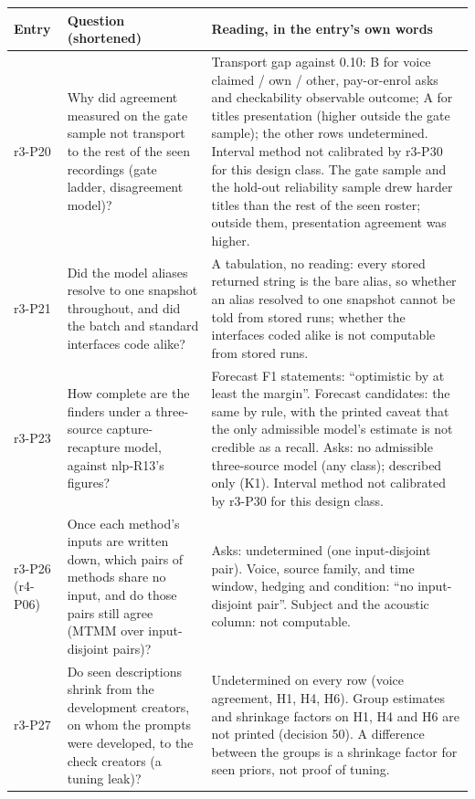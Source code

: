 \begin{table}[tp]
\centering
\footnotesize
\begin{tabular}{@{}p{}p{}p{}@{}}
\toprule
Entry & Question (shortened) & Reading, in the entry's own words \\
\midrule
r3-P20 & Why did agreement measured on the gate sample not transport to the rest of the seen recordings (gate ladder,
disagreement model)? & Transport gap against 0.10: B for voice claimed / own / other, pay-or-enrol asks and
checkability observable outcome; A for titles presentation (higher outside the gate sample); the other rows
undetermined. Interval method not calibrated by r3-P30 for this design class. The gate sample and the hold-out
reliability sample drew harder titles than the rest of the seen roster; outside them, presentation agreement was
higher. \\
r3-P21 & Did the model aliases resolve to one snapshot throughout, and did the batch and standard interfaces code
alike? & A tabulation, no reading: every stored returned string is the bare alias, so whether an alias resolved to one
snapshot cannot be told from stored runs; whether the interfaces coded alike is not computable from stored runs. \\
r3-P23 & How complete are the finders under a three-source capture-recapture model, against nlp-R13's figures? &
Forecast F1 statements: ``optimistic by at least the margin''. Forecast candidates: the same by rule, with the printed
caveat that the only admissible model's estimate is not credible as a recall. Asks: no admissible three-source model
(any class); described only (K1). Interval method not calibrated by r3-P30 for this design class. \\
r3-P26 (r4-P06) & Once each method's inputs are written down, which pairs of methods share no input, and do those
pairs still agree (MTMM over input-disjoint pairs)? & Asks: undetermined (one input-disjoint pair). Voice, source
family, and time window, hedging and condition: ``no input-disjoint pair''. Subject and the acoustic column: not
computable. \\
r3-P27 & Do seen descriptions shrink from the development creators, on whom the prompts were developed, to the check
creators (a tuning leak)? & Undetermined on every row (voice agreement, H1, H4, H6). Group estimates and shrinkage
factors on H1, H4 and H6 are not printed (decision 50). A difference between the groups is a shrinkage factor for seen
priors, not proof of tuning. \\

\end{tabular}
\end{table}
